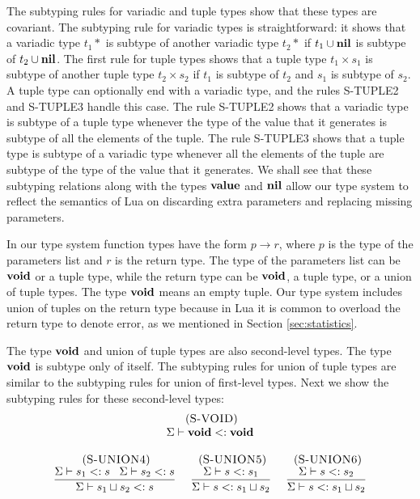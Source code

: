 The subtyping rules for variadic and tuple types show that
these types are covariant.
The subtyping rule for variadic types is straightforward:
it shows that a variadic type $t_{1}*$ is subtype of another
variadic type $t_{2}*$ if $t_{1} \cup \mathbf{nil}$ is subtype of
$t_{2} \cup \mathbf{nil}$.
The first rule for tuple types shows that a tuple type
$t_{1} \times s_{1}$ is subtype of another tuple type
$t_{2} \times s_{2}$ if $t_{1}$ is subtype of $t_{2}$
and $s_{1}$ is subtype of $s_{2}$.
A tuple type can optionally end with a variadic type, and
the rules \textsc{S-TUPLE2} and \textsc{S-TUPLE3} handle this case.
The rule \textsc{S-TUPLE2} shows that a variadic type is subtype of
a tuple type whenever the type of the value that it generates is
subtype of all the elements of the tuple.
The rule \textsc{S-TUPLE3} shows that a tuple type is subtype of a
variadic type whenever all the elements of the tuple are subtype of
the type of the value that it generates.
We shall see that these subtyping relations along with the
types $\mathbf{value}$ and $\mathbf{nil}$ allow our type system to reflect
the semantics of Lua on discarding extra parameters and
replacing missing parameters.

In our type system function types have the form $p \rightarrow r$,
where $p$ is the type of the parameters list and $r$ is the
return type.
The type of the parameters list can be $\mathbf{void}$ or a tuple type,
while the return type can be $\mathbf{void}$, a tuple type, or a union of
tuple types.
The type $\mathbf{void}$ means an empty tuple.
Our type system includes union of tuples on the return type because
in Lua it is common to overload the return type to denote error,
as we mentioned in Section \ref{sec:statistics}.

The type $\mathbf{void}$ and union of tuple types are also second-level types.
The type $\mathbf{void}$ is subtype only of itself.
The subtyping rules for union of tuple types are similar to the
subtyping rules for union of first-level types.
Next we show the subtyping rules for these second-level types:
\[
\begin{array}{c}
\begin{array}{c}
\; (\textsc{S-VOID})\\
\Sigma \vdash \mathbf{void} <: \mathbf{void}
\end{array}
\\ \\
\begin{array}{c}
\; (\textsc{S-UNION4})\\
\dfrac{\Sigma \vdash s_{1} <: s \;\;\;
       \Sigma \vdash s_{2} <: s}
      {\Sigma \vdash s_{1} \sqcup s_{2} <: s}
\end{array}
\;
\begin{array}{c}
\; (\textsc{S-UNION5})\\
\dfrac{\Sigma \vdash s <: s_{1}}
      {\Sigma \vdash s <: s_{1} \sqcup s_{2}}
\end{array}
\;
\begin{array}{c}
\; (\textsc{S-UNION6})\\
\dfrac{\Sigma \vdash s <: s_{2}}
      {\Sigma \vdash s <: s_{1} \sqcup s_{2}}
\end{array}
\end{array}
\]

